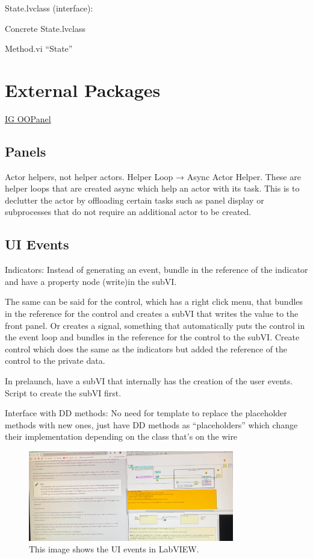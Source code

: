 \documentclass{article}
\begin{document}
\noindent State.lvclass (interface):

\quad Concrete State.lvclass

\quad Method.vi “State”

\section{External Packages}
\label{sec:external-packages}

\href{https://www.vipm.io/package/illuminatedg_lib_ig_oopanel/}{IG OOPanel}

\subsection{Panels}
\label{subsec:panels}

Actor helpers, not helper actors.
Helper Loop → Async Actor Helper.
These are helper loops that are created async which help an actor with its task.
This is to declutter the actor by offloading certain tasks such as panel display or subprocesses that do not require an additional actor to be created.

\subsection{UI Events}
\label{subsec:ui-events}

Indicators: Instead of generating an event, bundle in the reference of the indicator and have a property node (write)in the subVI.

The same can be said for the control, which has a right click menu, that bundles in the reference for the control and creates a subVI that writes the value to the front panel.
Or creates a signal, something that automatically puts the control in the event loop and bundles in the reference for the control to the subVI.
Create control which does the same as the indicators but added the reference of the control to the private data.

In prelaunch, have a subVI that internally has the creation of the user events.
Script to create the subVI first.

Interface with DD methods:
No need for template to replace the placeholder methods with new ones, just have DD methods as “placeholders” which change their implementation depending on the class that's on the wire

\begin{figure}[!ht]
    \centering
    \includegraphics[width=0.8\textwidth]{figures/justACS_ui_events}
    \caption{This image shows the UI events in LabVIEW.}
    \label{fig:justacs-ui-events}
\end{figure}
\end{document}
